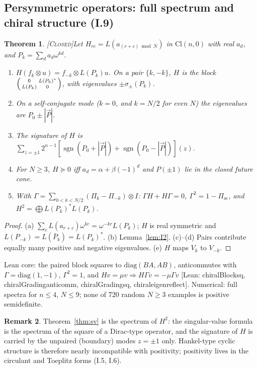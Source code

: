 \documentclass[11pt]{amsart}
\theoremstyle{plain}
\newtheorem{theorem}{Theorem}[section]
\theoremstyle{definition}
\newtheorem{remark}[theorem]{Remark}
\newcommand{\Cl}{\mathrm{Cl}}
\newcommand{\status}[1]{\textsc{[#1]}}
\newcommand{\leanus}{\textunderscore\allowbreak}
\newcommand{\lean}[1]{{\ttfamily\let\_\leanus #1}}
\begin{document}
\subsection{Persymmetric operators: full spectrum and chiral structure (I.9)}
\begin{theorem}\status{Closed}\label{thm:persym}
Let $H_{rc}=L(a_{(r+c)\bmod N})$ in $\Cl(n,0)$ with real $a_d$, and $P_k=\sum_da_d\omega^{kd}$.
\begin{enumerate}[label=(\alph*)]
\item $H(f_k\otimes u)=f_{-k}\otimes L(P_k)u$. On a pair $\{k,-k\}$, $H$ is the block
$\begin{psmallmatrix}0&L(P_k)^*\\L(P_k)&0\end{psmallmatrix}$, with eigenvalues $\pm\sigma_\pm(P_k)$.
\item On a self-conjugate mode ($k=0$, and $k=N/2$ for even $N$) the eigenvalues are $P_0\pm|\vec P|$.
\item The signature of $H$ is $\sum_{z=\pm1}2^{n-1}[\operatorname{sgn}(P_0+|\vec P|)+\operatorname{sgn}(P_0-|\vec P|)](z)$.
\item For $N\ge3$, $H\succeq0$ iff $a_d=\alpha+\beta(-1)^d$ and $P(\pm1)$ lie in the closed future cone.
\item With $\Gamma=\sum_{0<k<N/2}(\Pi_k-\Pi_{-k})\otimes I$: $\Gamma H+H\Gamma=0$,
$\Gamma^2=1-\Pi_{\mathrm{sc}}$, and $H^2=\bigoplus L(P_k)^*L(P_k)$.
\end{enumerate}
\end{theorem}
\begin{proof}
(a) $\sum_cL(a_{r+c})\omega^{kc}=\omega^{-kr}L(P_k)$; $H$ is real symmetric and
$L(P_{-k})=L(\bar P_k)=L(P_k)^*$. (b) Lemma~\ref{lem:I2}. (c)--(d) Pairs contribute
equally many positive and negative eigenvalues. (e) $H$ maps $V_k$ to $V_{-k}$.
\end{proof}
\noindent Lean core: the paired block squares to $\mathrm{diag}(BA,AB)$,
anticommutes with $\Gamma=\mathrm{diag}(1,-1)$, $\Gamma^2=1$, and
$Hv=\mu v\Rightarrow H\Gamma v=-\mu\Gamma v$
\lean{[Lean: chiralBlock\_sq, chiralGrading\_anticomm, chiralGrading\_sq, chiral\_eigen\_reflect]}.
Numerical: full spectra for $n\le4$, $N\le9$; none of 720 random $N\ge3$ examples is positive semidefinite.

\begin{remark}
Theorem~\ref{thm:sv} is the spectrum of $H^2$: the singular-value formula is the
spectrum of the square of a Dirac-type operator, and the signature of $H$ is
carried by the unpaired (boundary) modes $z=\pm1$ only. Hankel-type cyclic
structure is therefore nearly incompatible with positivity; positivity lives
in the circulant and Toeplitz forms (I.5, I.6).
\end{remark}
\end{document}
